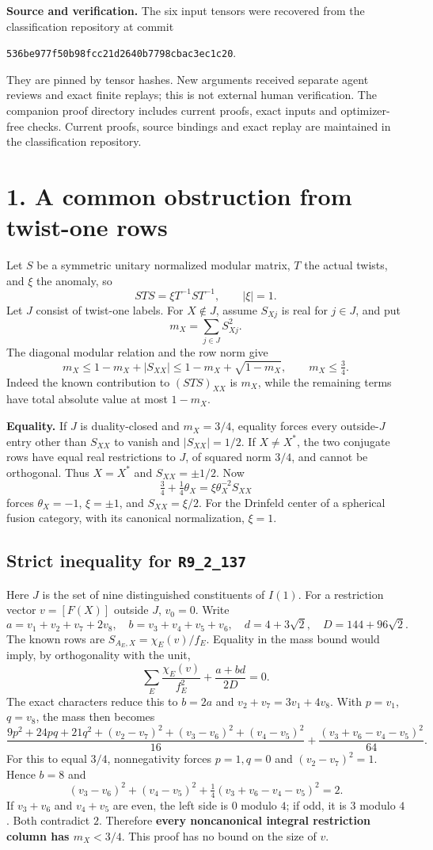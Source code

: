 \documentclass[11pt,a4paper]{article}
\newcommand{\R}[1]{\texttt{#1}}
\begin{document}
\textbf{Source and verification.} The six input tensors were recovered from the classification repository at commit
\begin{center}\small\texttt{536be977f50b98fcc21d2640b7798cbac3ec1c20}.\end{center}
They are pinned by tensor hashes. New arguments received separate agent reviews and exact finite replays; this is not external human verification. The companion proof directory includes current proofs, exact inputs and optimizer-free checks. Current proofs, source bindings and exact replay are maintained in the classification repository.

\newpage
\section*{1. A common obstruction from twist-one rows}
Let $S$ be a symmetric unitary normalized modular matrix, $T$ the actual twists, and $\xi$ the anomaly, so
\[
STS=\xi T^{-1}ST^{-1},\qquad |\xi|=1.
\]
Let $J$ consist of twist-one labels. For $X\notin J$, assume $S_{Xj}$ is real for $j\in J$, and put
\[
m_X=\sum_{j\in J}S_{Xj}^2.
\]
The diagonal modular relation and the row norm give
\[
m_X\le 1-m_X+|S_{XX}|\le 1-m_X+\sqrt{1-m_X},
\qquad\boxed{m_X\le\tfrac34}.
\]
Indeed the known contribution to $(STS)_{XX}$ is $m_X$, while the remaining terms have total absolute value at most $1-m_X$.

\textbf{Equality.} If $J$ is duality-closed and $m_X=3/4$, equality forces every outside-$J$ entry other than $S_{XX}$ to vanish and $|S_{XX}|=1/2$. If $X\ne X^*$, the two conjugate rows have equal real restrictions to $J$, of squared norm $3/4$, and cannot be orthogonal. Thus $X=X^*$ and $S_{XX}=\pm1/2$. Now
\[
\tfrac34+\tfrac14\theta_X=\xi\theta_X^{-2}S_{XX}
\]
forces $\theta_X=-1$, $\xi=\pm1$, and $S_{XX}=\xi/2$. For the Drinfeld center of a spherical fusion category, with its canonical normalization, $\xi=1$.

\subsection*{Strict inequality for \R{R9\_2\_137}}
Here $J$ is the set of nine distinguished constituents of $I(1)$. For a restriction vector $v=[F(X)]$ outside $J$, $v_0=0$. Write
\[
a=v_1+v_2+v_7+2v_8,\quad b=v_3+v_4+v_5+v_6,\quad
d=4+3\sqrt2,\quad D=144+96\sqrt2.
\]
The known rows are $S_{A_E,X}=\chi_E(v)/f_E$. Equality in the mass bound would imply, by orthogonality with the unit,
\[
\sum_E\frac{\chi_E(v)}{f_E^2}+\frac{a+bd}{2D}=0.
\]
The exact characters reduce this to $b=2a$ and $v_2+v_7=3v_1+4v_8$. With $p=v_1$, $q=v_8$, the mass then becomes
\[
\frac{9p^2+24pq+21q^2+(v_2-v_7)^2+(v_3-v_6)^2+(v_4-v_5)^2}{16}
+\frac{(v_3+v_6-v_4-v_5)^2}{64}.
\]
For this to equal $3/4$, nonnegativity forces $p=1,q=0$ and $(v_2-v_7)^2=1$. Hence $b=8$ and
\[
(v_3-v_6)^2+(v_4-v_5)^2+\tfrac14(v_3+v_6-v_4-v_5)^2=2.
\]
If $v_3+v_6$ and $v_4+v_5$ are even, the left side is $0$ modulo $4$; if odd, it is $3$ modulo $4$. Both contradict $2$. Therefore \textbf{every noncanonical integral restriction column has $m_X<3/4$}. This proof has no bound on the size of $v$.
\end{document}
